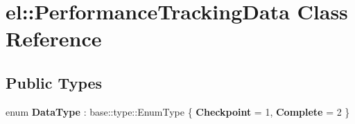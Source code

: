 \hypertarget{classel_1_1_performance_tracking_data}{}\section{el\+:\+:Performance\+Tracking\+Data Class Reference}
\label{classel_1_1_performance_tracking_data}
\subsection*{Public Types}
\begin{DoxyCompactItemize}
\item 
\mbox{\label{classel_1_1_performance_tracking_data_a1b45d5b1d5e76d0687aaffcf08302f17}} 
enum {\bfseries Data\+Type} \+: base\+::type\+::\+Enum\+Type \{ {\bfseries Checkpoint} = 1, 
{\bfseries Complete} = 2
 \}
\end{DoxyCompactItemize}
